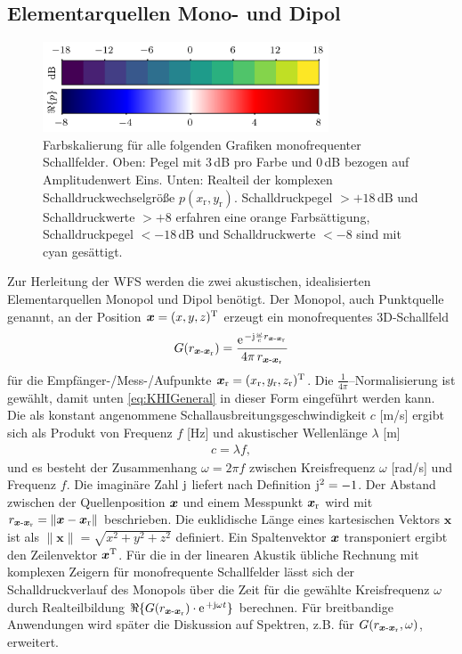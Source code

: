 \subsection{Elementarquellen Mono- und Dipol}
%
\begin{figure}[b]
\centering
\begin{plotfigures}
\includegraphics[width=85mm]{../python/plot_colorbar.png}
\end{plotfigures}
\caption{Farbskalierung für alle folgenden Grafiken monofrequenter
Schallfelder.
%
Oben: Pegel mit $3$\,dB pro Farbe und $0$\,dB bezogen auf Amplitudenwert Eins.
%
Unten: Realteil der komplexen Schalldruckwechselgröße $p(x_\mathrm{r},y_\mathrm{r})$.
%
Schalldruckpegel $>+18\,\text{dB}$ und Schalldruckwerte $>+8$ erfahren eine
orange Farbsättigung,
Schalldruckpegel $<-18\,\text{dB}$ und Schalldruckwerte $<-8$ sind mit cyan
gesättigt.
%
\cc
}
\label{fig:plot_colorbar}
\end{figure}
%
Zur Herleitung der WFS werden die zwei
akustischen, idealisierten Elementarquellen Monopol
und Dipol benötigt.
%
Der Monopol, auch Punktquelle genannt, an der Position $\bm{x}=(x,y,z)^\mathrm{T}$
erzeugt ein monofrequentes 3D-Schallfeld
\begin{align}
\label{eq:G03D}
G(r_{\xs\text{-}\xr})=\frac{\e^{-\im\wc r_{\xs\text{-}\xr}}}{4\pi \, r_{\xs\text{-}\xr}}
\end{align}
für die Empfänger-/Mess-/Aufpunkte
$\bm{x}_\mathrm{r}=(x_\mathrm{r},y_\mathrm{r},z_\mathrm{r})^\mathrm{T}$.
%
Die $\frac{1}{4 \pi}$--Normalisierung ist gewählt, damit unten
\Glg\eqref{eq:KHIGeneral} in dieser Form eingeführt werden kann.
%
Die als konstant angenommene Schallausbreitungsgeschwindigkeit $c$ [m/s] ergibt
sich als Produkt von Frequenz $f$ [Hz] und
akustischer Wellenlänge $\lambda$ [m]
\begin{align}
c = \lambda f,
\end{align}
und es besteht der Zusammenhang
$\omega = 2 \pi f$
zwischen Kreisfrequenz $\omega$ [rad/s] und Frequenz $f$.
%
Die imaginäre Zahl $\im$ liefert nach Definition $\im^2=-1$.
%
Der Abstand zwischen der Quellenposition $\bm{x}$ und einem Messpunkt $\bm{x}_\mathrm{r}$ wird mit
$r_{\bm{x}\text{-}\bm{x}_\mathrm{r}}=\|\bm{x}-\bm{x}_\mathrm{r}\|$ beschrieben.
%
Die euklidische Länge eines kartesischen Vektors $\bm{x}$ ist als
$\|\bm{x}\|=\sqrt{x^2+y^2+z^2}$ definiert.
%
Ein Spaltenvektor $\bm{x}$ transponiert ergibt den Zeilenvektor $\bm{x}^\mathrm{T}$.
%
Für die in der linearen Akustik übliche Rechnung mit komplexen Zeigern für
monofrequente Schallfelder lässt sich der Schalldruckverlauf des Monopols über
die Zeit für die gewählte Kreisfrequenz $\omega$  durch Realteilbildung
$\Re\{G(r_{\xs\text{-}\xr})\cdot\e^{+\im \omega t}\}$
berechnen.
%
Für breitbandige Anwendungen wird später die Diskussion auf Spektren, z.B. für
$G(r_{\bm{x}\text{-}\bm{x}_\mathrm{r}}, \omega)$, erweitert.


